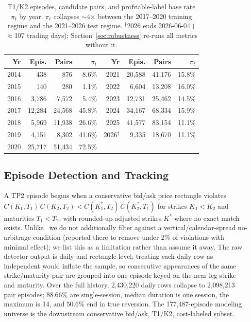 \documentclass[sigconf,review,anonymous]{acmart}
\begin{document}
\begin{table}[t]
\centering
\footnotesize
\begin{tabular}{rrrr@{\hskip 1.4em}rrrr}
\toprule
Yr & Epis. & Pairs & $\pi_t$ & Yr & Epis. & Pairs & $\pi_t$ \\
\midrule
2014 & 438 & 876 & 8.6\% & 2021 & 20{,}588 & 41{,}176 & 15.8\% \\
2015 & 140 & 280 & 1.1\% & 2022 & 6{,}604 & 13{,}208 & 16.0\% \\
2016 & 3{,}786 & 7{,}572 & 5.4\% & 2023 & 12{,}731 & 25{,}462 & 14.5\% \\
2017 & 12{,}284 & 24{,}568 & 45.8\% & 2024 & 34{,}167 & 68{,}334 & 15.9\% \\
2018 & 5{,}969 & 11{,}938 & 26.6\% & 2025 & 41{,}577 & 83{,}154 & 11.1\% \\
2019 & 4{,}151 & 8{,}302 & 41.6\% & 2026$^\dagger$ & 9{,}335 & 18{,}670 & 11.1\% \\
2020 & 25{,}717 & 51{,}434 & 72.5\% & & & & \\
\bottomrule
\end{tabular}
\caption{T1/K2 episodes, candidate pairs, and profitable-label base rate $\pi_t$ by year. $\pi_t$ collapses $\sim$4$\times$ between the 2017--2020 training regime and the 2021--2026 test regime. $^\dagger$2026 ends 2026-06-04 ($\approx$107 trading days); Section~\ref{sec:robustness} re-runs all metrics without it.}
\label{tab:peryear}
\end{table}

\subsection{Episode Detection and Tracking}
\label{sec:episode-tracking}
A TP2 episode begins when a conservative bid/ask price rectangle violates $C(K_1,T_1)\,C(K_2,T_2) < C(K_1^{\ast},T_2)\,C(K_2^{\ast},T_1)$ for strikes $K_1<K_2$ and maturities $T_1<T_2$, with rounded-up adjusted strikes $K^{\ast}$ where no exact match exists. Unlike~\cite{glasserman2025tp2} we do not additionally filter against a vertical/calendar-spread no-arbitrage condition (reported there to remove under 2\% of violations with minimal effect); we list this as a limitation rather than assume it away. The raw detector output is daily and rectangle-level; treating each daily row as independent would inflate the sample, so consecutive appearances of the same strike/maturity pair are grouped into one episode keyed on the near-leg strike and maturity. Over the full history, 2{,}430{,}220 daily rows collapse to 2{,}098{,}213 pair episodes; 88.66\% are single-session, median duration is one session, the maximum is 14, and 50.6\% end in true reversion. The 177{,}487-episode modeling universe is the downstream conservative bid/ask, T1/K2, cost-labeled subset.
\end{document}
